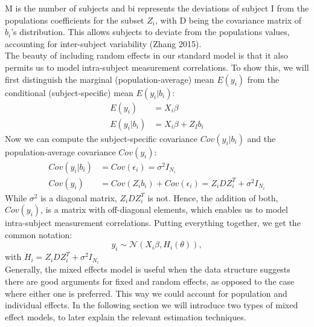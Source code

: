 \documentclass[a4paper,11pt]{article}
\begin{document}
M is the number of subjects and bi represents the deviations of subject I from the populations coefficients for the subset $Z_i$, with D being the covariance matrix of $b_i$’s distribution. This allows subjects to deviate from the populations values, accounting for inter-subject variability (Zhang 2015).\\
The beauty of including random effects in our standard model is that it also permits us to model intra-subject measurement correlations. To show this, we will first distinguish the marginal (population-average) mean $E(y_i)$ from the conditional (subject-specific) mean $E(y_i|b_i)$:
\begin{align*}
		E(y_i)&=X_i\beta\\
		E(y_i|b_i)&=X_i\beta+Z_Ib_i
\end{align*}
Now we can compute the subject-specific covariance $Cov(y_i|b_i)$ and the population-average covariance $Cov(y_i)$:
\begin{align*}
	Cov(y_i|b_i)&=Cov(\epsilon_i)=\sigma^2I_{N_i}\\
	Cov(y_i)&=Cov(Z_ib_i)+Cov(\epsilon_i)=Z_iDZ_i^T+\sigma^2I_{N_i}
\end{align*}
While $\sigma^2$ is a diagonal matrix, $Z_iDZ_i^T$ is not. Hence, the addition of both, $Cov(y_i)$, is a matrix with off-diagonal elements, which enables us to model intra-subject measurement correlations.
Putting everything together, we get the common notation:
\begin{equation}\label{xy}
	y_i \sim\mathcal{N}(X_i\beta,H_i(\theta)),
\end{equation}
with $H_i=Z_iDZ_i^T + \sigma^2I_{N_i}$\\
Generally, the mixed effects model is useful when the data structure suggests there are good arguments for fixed and random effects, as opposed to the case where either one is preferred. This way we could account for population and individual effects. In the following section we will introduce two types of mixed effect models, to later explain the relevant estimation techniques. 

 
\end{document}
